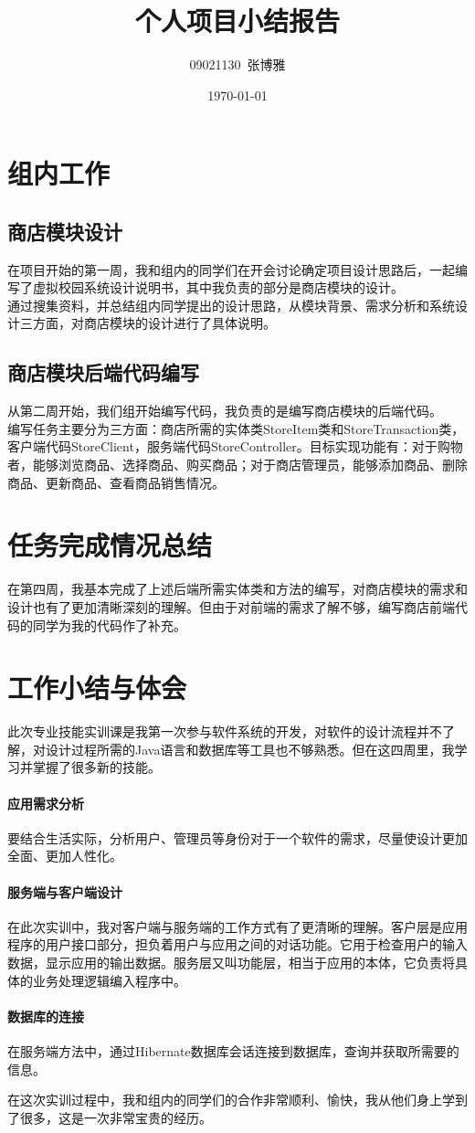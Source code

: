 \documentclass{article}
\title{个人项目小结报告}
\author{09021130~张博雅}
\date{\today}
\begin{document}
\maketitle

\section{组内工作}

\subsection{商店模块设计}
在项目开始的第一周，我和组内的同学们在开会讨论确定项目设计思路后，一起编写了虚拟校园系统设计说明书，其中我负责的部分是商店模块的设计。\\

通过搜集资料，并总结组内同学提出的设计思路，从模块背景、需求分析和系统设计三方面，对商店模块的设计进行了具体说明。
\subsection{商店模块后端代码编写}
从第二周开始，我们组开始编写代码，我负责的是编写商店模块的后端代码。\\

编写任务主要分为三方面：商店所需的实体类StoreItem类和StoreTransaction类，客户端代码StoreClient，服务端代码StoreController。目标实现功能有：对于购物者，能够浏览商品、选择商品、购买商品；对于商店管理员，能够添加商品、删除商品、更新商品、查看商品销售情况。

\section{任务完成情况总结}
在第四周，我基本完成了上述后端所需实体类和方法的编写，对商店模块的需求和设计也有了更加清晰深刻的理解。但由于对前端的需求了解不够，编写商店前端代码的同学为我的代码作了补充。
\section{工作小结与体会}
此次专业技能实训课是我第一次参与软件系统的开发，对软件的设计流程并不了解，对设计过程所需的Java语言和数据库等工具也不够熟悉。但在这四周里，我学习并掌握了很多新的技能。

\paragraph{应用需求分析}
要结合生活实际，分析用户、管理员等身份对于一个软件的需求，尽量使设计更加全面、更加人性化。

\paragraph{服务端与客户端设计}
在此次实训中，我对客户端与服务端的工作方式有了更清晰的理解。客户层是应用程序的用户接口部分，担负着用户与应用之间的对话功能。它用于检查用户的输入数据，显示应用的输出数据。服务层又叫功能层，相当于应用的本体，它负责将具体的业务处理逻辑编入程序中。

\paragraph{数据库的连接}
在服务端方法中，通过Hibernate数据库会话连接到数据库，查询并获取所需要的信息。

在这次实训过程中，我和组内的同学们的合作非常顺利、愉快，我从他们身上学到了很多，这是一次非常宝贵的经历。
\end{document}
